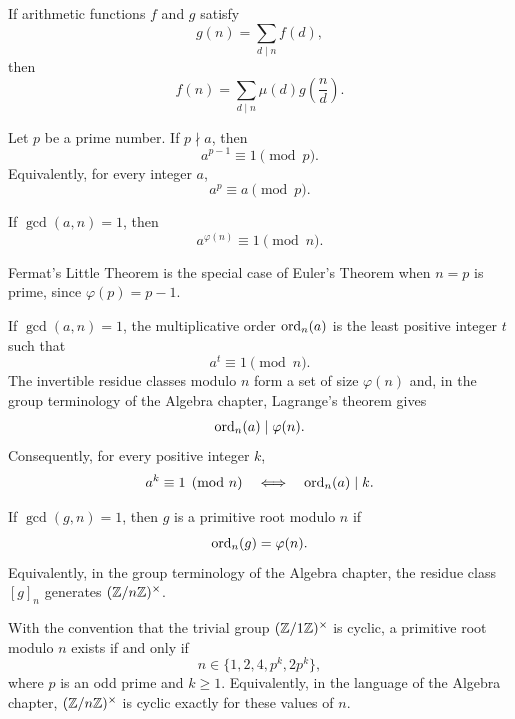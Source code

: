    \begin{theorem}
        If arithmetic functions $f$ and $g$ satisfy
        \[
            g(n)=\sum_{d\mid n}f(d),
        \]
        then
        \[
            f(n)=\sum_{d\mid n}\mu(d)g\!\left(\frac{n}{d}\right).
        \]
    \end{theorem}

    \begin{theorem}
        Let $p$ be a prime number. If $p\nmid a$, then
        \[
            a^{p-1}\equiv 1\pmod p.
        \]
        Equivalently, for every integer $a$,
        \[
            a^p\equiv a\pmod p.
        \]
    \end{theorem}

    \begin{theorem}
        If $\gcd(a,n)=1$, then
        \[
            a^{\varphi(n)}\equiv 1\pmod n.
        \]
    \end{theorem}

    \begin{remark}
        Fermat's Little Theorem is the special case of Euler's Theorem when
        $n=p$ is prime, since $\varphi(p)=p-1$.
    \end{remark}

    \begin{proposition}
        If $\gcd(a,n)=1$, the multiplicative order $\operatorname{ord}_n(a)$ is the least
        positive integer $t$ such that
        \[
            a^t\equiv1\pmod n.
        \]
        The invertible residue classes modulo $n$ form a set of size
        $\varphi(n)$ and, in the group terminology of the Algebra chapter,
        Lagrange's theorem gives
        \[
            \operatorname{ord}_n(a)\mid\varphi(n).
        \]
        Consequently, for every positive integer $k$,
        \[
            a^k\equiv 1\pmod n
            \quad\Longleftrightarrow\quad
            \operatorname{ord}_n(a)\mid k.
        \]
    \end{proposition}

    \begin{definition}
        If $\gcd(g,n)=1$, then $g$ is a primitive root modulo $n$ if
        \[
            \operatorname{ord}_n(g)=\varphi(n).
        \]
        Equivalently, in the group terminology of the Algebra chapter, the
        residue class $[g]_n$ generates $(\mathbb{Z}/n\mathbb{Z})^\times$.
    \end{definition}

    \begin{theorem}
        With the convention that the trivial group $(\mathbb{Z}/1\mathbb{Z})^\times$ is cyclic,
        a primitive root modulo $n$ exists if and only if
        \[
            n\in\{1,2,4,p^k,2p^k\},
        \]
        where $p$ is an odd prime and $k\geq 1$. Equivalently, in the language
        of the Algebra chapter, $(\mathbb{Z}/n\mathbb{Z})^\times$ is cyclic exactly for these
        values of $n$.
    \end{theorem}

